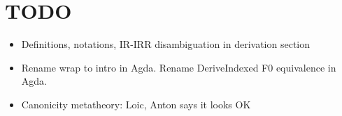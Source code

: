 \documentclass[acmsmall,screen,review,anonymous]{acmart}
\begin{document}















\section{TODO}


\begin{itemize}
  \item Definitions, notations, IR-IRR disambiguation in derivation section
  \item Rename wrap to intro in Agda. Rename DeriveIndexed F0 equivalence in Agda.
  \item Canonicity metatheory: Loic, Anton says it looks OK

\end{itemize}



\end{document}
